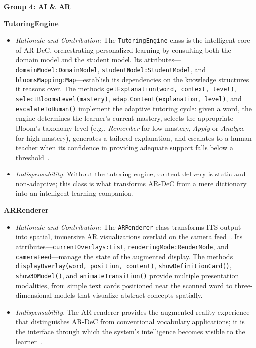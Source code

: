 \bigskip
\noindent\textbf{Group 4: AI \& AR}

\medskip
\textbf{TutoringEngine}
\begin{itemize}
\item \textit{Rationale and Contribution:} The \texttt{TutoringEngine} class is the intelligent core of AR-DeC, orchestrating personalized learning by consulting both the domain model and the student model. Its attributes---\texttt{domainModel:DomainModel}, \texttt{studentModel:StudentModel}, and \texttt{bloomsMapping:Map}---establish its dependencies on the knowledge structures it reasons over. The methods \texttt{getExplanation(word, context, level)}, \texttt{selectBloomsLevel(mastery)}, \texttt{adaptContent(explanation, level)}, and \texttt{escalateToHuman()} implement the adaptive tutoring cycle: given a word, the engine determines the learner's current mastery, selects the appropriate Bloom's taxonomy level (e.g., \emph{Remember} for low mastery, \emph{Apply} or \emph{Analyze} for high mastery), generates a tailored explanation, and escalates to a human teacher when its confidence in providing adequate support falls below a threshold~\cite{Bloom1956,Krathwohl2002}.
\item \textit{Indispensability:} Without the tutoring engine, content delivery is static and non-adaptive; this class is what transforms AR-DeC from a mere dictionary into an intelligent learning companion.
\end{itemize}

\medskip
\textbf{ARRenderer}
\begin{itemize}
\item \textit{Rationale and Contribution:} The \texttt{ARRenderer} class transforms ITS output into spatial, immersive AR visualizations overlaid on the camera feed~\cite{Azuma1997,Wu2013}. Its attributes---\texttt{currentOverlays:List}, \texttt{renderingMode:RenderMode}, and \texttt{cameraFeed}---manage the state of the augmented display. The methods \texttt{displayOverlay(word, position, content)}, \texttt{showDefinitionCard()}, \texttt{show3DModel()}, and \texttt{animateTransition()} provide multiple presentation modalities, from simple text cards positioned near the scanned word to three-dimensional models that visualize abstract concepts spatially.
\item \textit{Indispensability:} The AR renderer provides the augmented reality experience that distinguishes AR-DeC from conventional vocabulary applications; it is the interface through which the system's intelligence becomes visible to the learner~\cite{Akcayir2017,Ibanez2018}.
\end{itemize}

